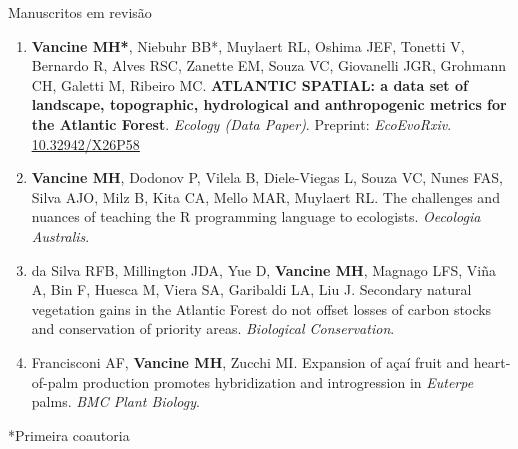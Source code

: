 \documentclass{resume}
\begin{document}
\begin{rSection}{Manuscritos em revisão}

\begin{enumerate} 

\item {\bf Vancine MH*}, Niebuhr BB*, Muylaert RL, Oshima JEF, Tonetti V, Bernardo R, Alves RSC, Zanette EM, Souza VC, Giovanelli JGR, Grohmann CH, Galetti M, Ribeiro MC. {\bf ATLANTIC SPATIAL: a data set of landscape, topographic, hydrological and anthropogenic metrics for the Atlantic Forest}. {\it Ecology (Data Paper)}. Preprint: {\it EcoEvoRxiv}. \href{https://doi.org/10.32942/X26P58}{\underline{10.32942/X26P58}}

\item {\bf Vancine MH}, Dodonov P, Vilela B, Diele-Viegas L, Souza VC, Nunes FAS, Silva AJO, Milz B, Kita CA, Mello MAR, Muylaert RL. The challenges and nuances of teaching the R programming language to ecologists. {\it Oecologia Australis}.

\item da Silva RFB, Millington JDA, Yue D, {\bf Vancine MH}, Magnago LFS, Viña A, Bin F, Huesca M, Viera SA, Garibaldi LA, Liu J. Secondary natural vegetation gains in the Atlantic Forest do not offset losses of carbon stocks and conservation of priority areas. {\it Biological Conservation}.

\item Francisconi AF, {\bf Vancine MH}, Zucchi MI. Expansion of açaí fruit and heart-of-palm production promotes hybridization and introgression in {\it Euterpe} palms. {\it BMC Plant Biology}.

\end{enumerate} 

*Primeira coautoria

\end{rSection}


\end{document}
